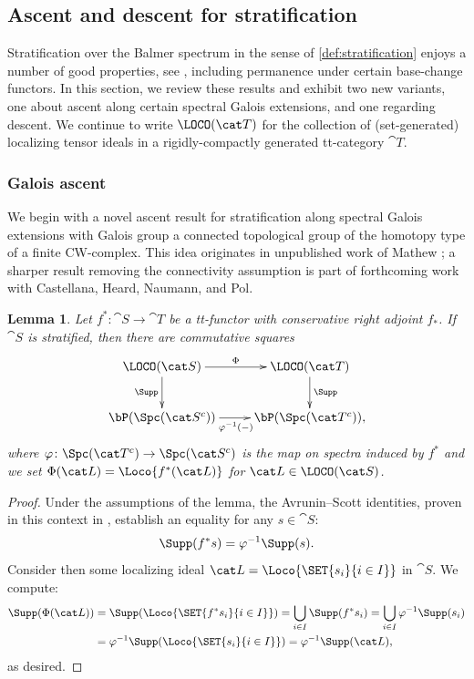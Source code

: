\documentclass{amsart}%
\numberwithin{equation}{section}%
\newtheorem{Lem}[subsection]{Lemma}
\theoremstyle{remark}
\begin{document}
\subsection{Ascent and descent for stratification}\label{ssec:ttascentanddescent}

Stratification over the Balmer spectrum in the sense of \cref{def:stratification} enjoys a number of good properties, see \cite{bhs1}, including permanence under certain base-change functors. In this section, we review these results and exhibit two new variants, one about ascent along certain spectral Galois extensions, and one regarding descent. We continue to write $\LOCO(\cat T)$ for the collection of (set-generated) localizing tensor ideals in a rigidly-compactly generated tt-category $\cat T$.

\subsubsection*{Galois ascent}

We begin with a novel ascent result for stratification along spectral Galois extensions with Galois group a connected topological group of the homotopy type of a finite CW-complex. This idea originates in unpublished work of Mathew \cite{mathew_torus}; a sharper result removing the connectivity assumption is part of forthcoming work with Castellana, Heard, Naumann, and Pol. 

\begin{Lem}\label{lem:Suppcompatibility}
Let $f^*\colon \cat S \to \cat T$ be a tt-functor with conservative right adjoint $f_*$. If $\cat S$ is stratified, then there are commutative squares
\begin{equation}\label{eq:Suppcompatibility}
    \vcenter{
    \xymatrix{\LOCO(\cat S) \ar[r]^-{\Phi} \ar[d]_-{\Supp} & \LOCO(\cat T) \ar[d]^-{\Supp} \\
    \bP(\Spc(\cat S^c)) \ar[r]_{\varphi^{-1}(-)} & \bP(\Spc(\cat T^c)),}
    }
\end{equation}
where $\varphi\colon \Spc(\cat T^c) \to \Spc(\cat S^c)$ is the map on spectra induced by $f^*$ and we set $\Phi(\cat L) = \Loco{f^*(\cat L)}$ for $\cat L \in \LOCO(\cat S)$.
\end{Lem}
\begin{proof}
Under the assumptions of the lemma, the Avrunin--Scott identities, proven in this context in \cite{bchs1}, establish an equality for any $s \in \cat S$:
\[
\Supp(f^*s) = \varphi^{-1}\Supp(s).
\]
Consider then some localizing ideal $\cat L = \Loco{\SET{s_i}{i\in I}}$ in $\cat S$. We compute:
\begin{align*}
    \Supp(\Phi(\cat L)) & = \Supp(\Loco{\SET{f^*s_i}{i\in I}}) 
    = \bigcup_{i \in I} \Supp(f^*s_i)  
    = \bigcup_{i \in I} \varphi^{-1}\Supp(s_i) \\
    & = \varphi^{-1}\Supp(\Loco{\SET{s_i}{i\in I}}) 
    = \varphi^{-1}\Supp(\cat L),
\end{align*}
as desired.
\end{proof}
\end{document}
